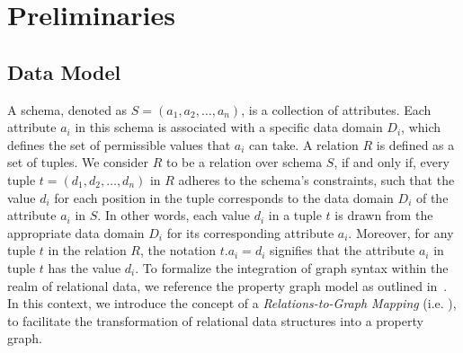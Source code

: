 \section{Preliminaries}
\label{sec:preliminaries}

\subsection{Data Model}
\label{sec:data-model}

A schema, denoted as \(S = (a_1, a_2, \ldots, a_n)\), is a collection of attributes. Each attribute \(a_i\) in this schema is associated with a specific data domain \(D_i\), which defines the set of permissible values that \(a_i\) can take.
A relation \(R\) is defined as a set of tuples. We consider \(R\) to be a relation over schema \(S\), if and only if, every tuple \(t = (d_1, d_2, \ldots, d_n)\) in \(R\) adheres to the schema's constraints, such that the value \(d_i\) for each position in the tuple corresponds to the data domain \(D_i\) of the attribute \(a_i\) in \(S\). In other words, each value \(d_i\) in a tuple \(t\) is drawn from the appropriate data domain \(D_i\) for its corresponding attribute \(a_i\).
Moreover, for any tuple \(t\) in the relation \(R\), the notation \(t.a_i = d_i\) signifies that the attribute \(a_i\) in tuple \(t\) has the value \(d_i\).
To formalize the integration of graph syntax within the realm of relational data, we reference the property graph model as outlined in~\cite{property-graph}. In this context, we introduce the concept of a \textit{Relations-to-Graph Mapping} (i.e. \rgmapping), to facilitate the transformation of relational data structures into a property graph.

